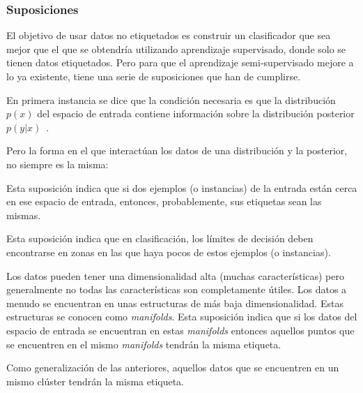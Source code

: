 \subsubsection{Suposiciones}
El objetivo de usar datos no etiquetados es construir un clasificador que sea
mejor que el que se obtendría utilizando aprendizaje supervisado, donde solo se
tienen datos etiquetados. Pero para que el aprendizaje semi-supervisado mejore a
lo ya existente, tiene una serie de suposiciones que han de cumplirse.

En primera instancia se dice que la condición necesaria es que la distribución
$p(x)$ del espacio de entrada contiene información sobre la distribución
posterior $p(y|x)$~\cite{vanEngelen2020}.

Pero la forma en el que interactúan los datos de una distribución y la posterior,
no siempre es la misma:

\begin{tcolorbox}[colback=cyan!5!white,colframe=cyan!75!black,title=\textit{Smoothness assumption}]
    Esta suposición indica que si dos ejemplos (o instancias) de la entrada
    están cerca en ese espacio de entrada, entonces, probablemente, sus
    etiquetas sean las mismas.
\end{tcolorbox}

\begin{tcolorbox}[colback=cyan!5!white,colframe=cyan!75!black,title=\textit{Low-density assumption}]
    Esta suposición indica que en clasificación, los límites de decisión deben
    encontrarse en zonas en las que haya pocos de estos ejemplos (o instancias).
\end{tcolorbox}

\begin{tcolorbox}[colback=cyan!5!white,colframe=cyan!75!black,title=\textit{Manifold assumption}]
    Los datos pueden tener una dimensionalidad alta (muchas características)
    pero generalmente no todas las características son completamente útiles. Los
    datos a menudo se encuentran en unas estructuras de más baja
    dimensionalidad. Estas estructuras se conocen como \emph{manifolds}.
    Esta suposición indica que si los datos del espacio de entrada se encuentran
    en estas \emph{manifolds} entonces aquellos puntos que se encuentren en
    el mismo \emph{manifolds} tendrán la misma etiqueta.
   ~\cite{towardsdatascience:semi,vanEngelen2020}
\end{tcolorbox}

\begin{tcolorbox}[colback=cyan!5!white,colframe=cyan!75!black,title=\textit{Cluster assumption}]
    Como generalización de las anteriores, aquellos datos que se encuentren en
    un mismo clúster tendrán la misma etiqueta.
\end{tcolorbox}


